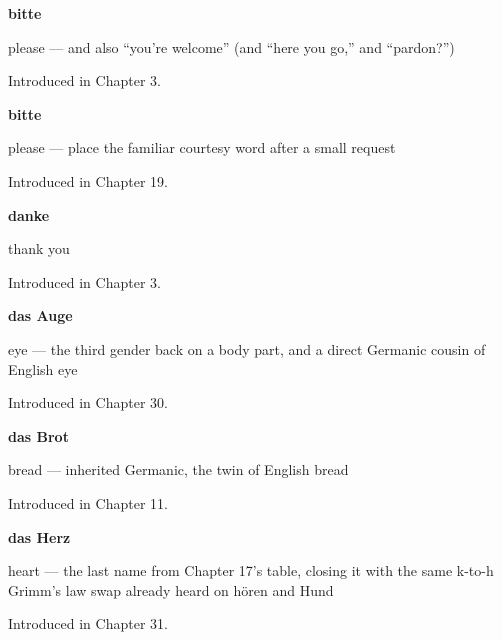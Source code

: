 \noindent\begin{minipage}[t]{\linewidth}
\raggedright
\textbf{bitte}\par
\small please — and also \textquotedblleft{}you're welcome\textquotedblright{} (and \textquotedblleft{}here you go,\textquotedblright{} and \textquotedblleft{}pardon?\textquotedblright{})\par
\footnotesize Introduced in Chapter 3.
\end{minipage}\par\medskip

\noindent\begin{minipage}[t]{\linewidth}
\raggedright
\textbf{bitte}\par
\small please — place the familiar courtesy word after a small request\par
\footnotesize Introduced in Chapter 19.
\end{minipage}\par\medskip

\noindent\begin{minipage}[t]{\linewidth}
\raggedright
\textbf{danke}\par
\small thank you\par
\footnotesize Introduced in Chapter 3.
\end{minipage}\par\medskip

\noindent\begin{minipage}[t]{\linewidth}
\raggedright
\textbf{das Auge}\par
\small eye — the third gender back on a body part, and a direct Germanic cousin of English eye\par
\footnotesize Introduced in Chapter 30.
\end{minipage}\par\medskip

\noindent\begin{minipage}[t]{\linewidth}
\raggedright
\textbf{das Brot}\par
\small bread — inherited Germanic, the twin of English bread\par
\footnotesize Introduced in Chapter 11.
\end{minipage}\par\medskip

\noindent\begin{minipage}[t]{\linewidth}
\raggedright
\textbf{das Herz}\par
\small heart — the last name from Chapter 17's table, closing it with the same k-to-h Grimm's law swap already heard on hören and Hund\par
\footnotesize Introduced in Chapter 31.
\end{minipage}\par\medskip


